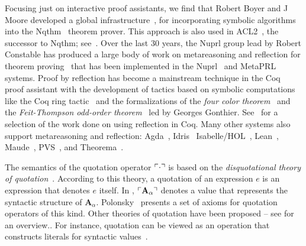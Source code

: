 \documentclass[fleqn]{llncs}
\begin{document}
Focusing just on interactive proof assistants, we find
that Robert Boyer and J Moore developed a global
infrastructure~\cite{BoyerMoore81}, for
incorporating symbolic algorithms into the Nqthm~\cite{BoyerMoore88}
theorem prover.  This approach is also used in
ACL2~\cite{KaufmannMoore97}, the successor to Nqthm;
see~\cite{HuntEtAl05}.  Over the last 30 years, the Nuprl group lead
by Robert Constable has produced a large body of work on metareasoning
and reflection for theorem
proving~\cite{AllenEtAl90,Barzilay05,Constable95,Howe92,KnoblockConstable86,Nogin05,Yu07}
that has been implemented in the Nuprl~\cite{Constable86} and
MetaPRL~\cite{HickeyEtAl03} systems.  Proof by reflection has become a
mainstream technique in the Coq~\cite{Coq8.5} proof assistant with the
development of tactics based on symbolic computations like the Coq
ring tactic~\cite{Boutin97,GregoireMahboubi05} and the formalizations
of the \emph{four color theorem}~\cite{Gonthier08} and the
\emph{Feit-Thompson odd-order theorem}~\cite{GonthierEtAl13} led by
Georges Gonthier.
See~\cite{Boutin97,BraibantPous11,Chlipala13,gonthier2010introduction,GregoireMahboubi05,JamesHinze09,OostdijkGeuvers02}
for a selection of the work done on using reflection in Coq.
Many other systems also support metareasoning and reflection:
Agda~\cite{Norell09,VanDerWalt12,VanDerWaltSwierstra12},
Idris~\cite{Christiansen:2014,Christiansen:2016,Christiansen:2016:Thesis}
Isabelle/HOL~\cite{ChaiebNipkow08},
Lean~\cite{ebner2017metaprogramming},
Maude~\cite{ClavelMeseguer02}, 
PVS~\cite{VonHenkeEtAl98}, 
and
Theorema~\cite{GieseBuchberger07,BuchbergerEtAl06}.

The semantics of the quotation operator $\ulcorner\cdot\urcorner$ is based on
the \emph{disquotational theory of quotation}~\cite{Quotation12}.
According to this theory, a quotation of an expression $e$ is an
expression that denotes $e$ itself.  In {\churchqe},
$\ulcorner\textbf{A}_\alpha\urcorner$ denotes a value that represents the
syntactic structure of $\textbf{A}_\alpha$.  Polonsky~\cite{Polonsky11} 
presents a set of axioms for quotation operators of this
kind.  Other theories of quotation have been proposed -- see
\cite{Quotation12} for an overview..  For instance, quotation can be viewed as
an operation that constructs literals for syntactic values~\cite{Rabe15}.
\end{document}
